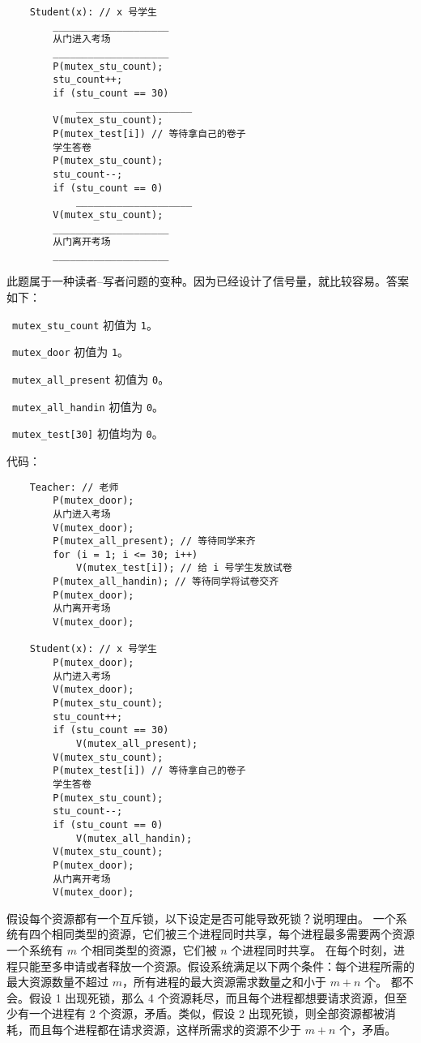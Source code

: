 \begin{problems}
\begin{verbatim}
    Student(x): // x 号学生
        ____________________
        从门进入考场
        ____________________
        P(mutex_stu_count);
        stu_count++;
        if (stu_count == 30)
            ____________________
        V(mutex_stu_count);
        P(mutex_test[i]) // 等待拿自己的卷子
        学生答卷
        P(mutex_stu_count);
        stu_count--;
        if (stu_count == 0)
            ____________________
        V(mutex_stu_count);
        ____________________
        从门离开考场
        ____________________
        \end{verbatim}
        \sol 此题属于一种读者{--}写者问题的变种。因为已经设计了信号量，就比较容易。答案如下：
        \begin{compactitem}
            \item\ \verb|mutex_stu_count| 初值为 \verb|1|。
            \item\ \verb|mutex_door| 初值为 \verb|1|。
            \item\ \verb|mutex_all_present| 初值为 \verb|0|。
            \item\ \verb|mutex_all_handin| 初值为 \verb|0|。
            \item\ \verb|mutex_test[30]| 初值均为 \verb|0|。
        \end{compactitem}
        代码：
        \begin{verbatim}
    Teacher: // 老师
        P(mutex_door);
        从门进入考场
        V(mutex_door);
        P(mutex_all_present); // 等待同学来齐
        for (i = 1; i <= 30; i++)
            V(mutex_test[i]); // 给 i 号学生发放试卷
        P(mutex_all_handin); // 等待同学将试卷交齐
        P(mutex_door);
        从门离开考场
        V(mutex_door);

    Student(x): // x 号学生
        P(mutex_door);
        从门进入考场
        V(mutex_door);
        P(mutex_stu_count);
        stu_count++;
        if (stu_count == 30)
            V(mutex_all_present);
        V(mutex_stu_count);
        P(mutex_test[i]) // 等待拿自己的卷子
        学生答卷
        P(mutex_stu_count);
        stu_count--;
        if (stu_count == 0)
            V(mutex_all_handin);
        V(mutex_stu_count);
        P(mutex_door);
        从门离开考场
        V(mutex_door);
        \end{verbatim}
        \pro 假设每个资源都有一个互斥锁，以下设定是否可能导致死锁？说明理由。
            \qn 一个系统有四个相同类型的资源，它们被三个进程同时共享，每个进程最多需要两个资源一个系统有 $m$ 个相同类型的资源，它们被 $n$ 个进程同时共享。
            \qn 在每个时刻，进程只能至多申请或者释放一个资源。假设系统满足以下两个条件：每个进程所需的最大资源数量不超过 $m$，所有进程的最大资源需求数量之和小于 $m+n$ 个。
        \sol 都不会。假设 1 出现死锁，那么 4 个资源耗尽，而且每个进程都想要请求资源，但至少有一个进程有 2 个资源，矛盾。类似，假设 2 出现死锁，则全部资源都被消耗，而且每个进程都在请求资源，这样所需求的资源不少于 $m+n$ 个，矛盾。
    \end{problems}

